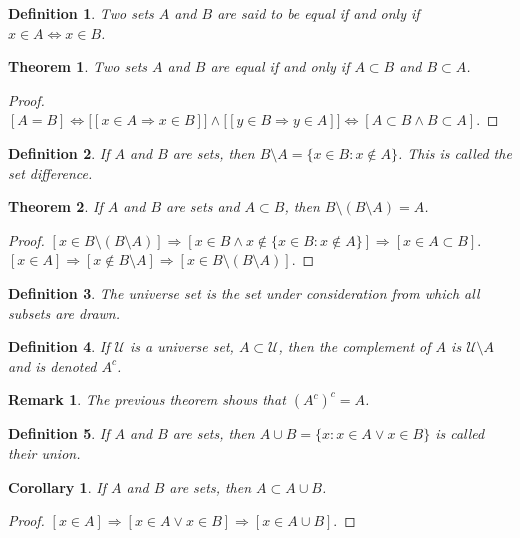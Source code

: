 \documentclass[12pt,oneside]{book}
\theoremstyle{mystyle}
\newtheorem{theorem}{Theorem}[section]
\newtheorem{definition}{Definition}[section]
\newtheorem{corollary}{Corollary}[section]
\newtheorem{remark}{Remark}[section]
\begin{document}
\begin{definition}
Two sets $A$ and $B$ are said to be equal if and only if $x\in A \Leftrightarrow x\in B$.
\end{definition}

\begin{theorem}
Two sets $A$ and $B$ are equal if and only if $A\subset B$ and $B\subset A$.
\end{theorem}
\begin{proof}
$[A=B]\Leftrightarrow\big[[x\in A \Rightarrow x\in B]\big]\land \big[[y\in B \Rightarrow y\in A]\big]\Leftrightarrow [A\subset B\land B\subset A]$. 
\end{proof}

\begin{definition}
If $A$ and $B$ are sets, then $B\setminus A = \{x\in B:x\notin A\}$. This is called the set difference.
\end{definition}

\begin{theorem}
If $A$ and $B$ are sets and $A\subset B$, then $B\setminus(B\setminus A)=A$.
\end{theorem}
\begin{proof}
$[x\in B\setminus(B\setminus A)]\Rightarrow [x\in B \land x\notin \{x\in B:x\notin A\}]\Rightarrow [x\in A\subset B]$. $[x\in A]\Rightarrow [x\notin B\setminus A]\Rightarrow [x\in B\setminus(B\setminus A)]$.
\end{proof}

\begin{definition}
The universe set is the set under consideration from which all subsets are drawn.
\end{definition}

\begin{definition}
If $\mathcal{U}$ is a universe set, $A\subset \mathcal{U}$, then the complement of $A$ is $\mathcal{U}\setminus A$ and is denoted $A^c$.
\end{definition}

\begin{remark}
The previous theorem shows that $(A^c)^c = A$.
\end{remark}

\begin{definition}
If $A$ and $B$ are sets, then $A\cup B = \{x: x\in A \lor x\in B\}$ is called their union.
\end{definition}

\begin{corollary}
If $A$ and $B$ are sets, then $A\subset A\cup B$.
\end{corollary}
\begin{proof}
$[x\in A]\Rightarrow [x\in A\lor x\in B]\Rightarrow [x\in A\cup B]$.
\end{proof}
\end{document}
